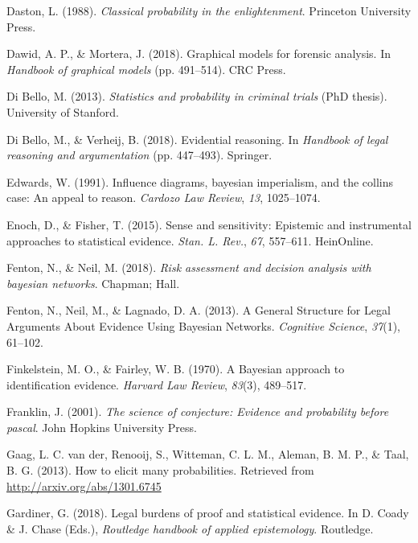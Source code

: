 \documentclass[11pt,dvipsnames,enabledeprecatedfontcommands]{scrartcl}
\begin{document}
\leavevmode\hypertarget{ref-daston1988}{}%
Daston, L. (1988). \emph{Classical probability in the enlightenment}.
Princeton University Press.

\leavevmode\hypertarget{ref-dawid2018graphical}{}%
Dawid, A. P., \& Mortera, J. (2018). Graphical models for forensic
analysis. In \emph{Handbook of graphical models} (pp. 491--514). CRC
Press.

\leavevmode\hypertarget{ref-di2013statistics}{}%
Di Bello, M. (2013). \emph{Statistics and probability in criminal
trials} (PhD thesis). University of Stanford.

\leavevmode\hypertarget{ref-di2018evidential}{}%
Di Bello, M., \& Verheij, B. (2018). Evidential reasoning. In
\emph{Handbook of legal reasoning and argumentation} (pp. 447--493).
Springer.

\leavevmode\hypertarget{ref-Edwards1991Influence-diagr}{}%
Edwards, W. (1991). Influence diagrams, bayesian imperialism, and the
collins case: An appeal to reason. \emph{Cardozo Law Review}, \emph{13},
1025--1074.

\leavevmode\hypertarget{ref-enoch2015sense}{}%
Enoch, D., \& Fisher, T. (2015). Sense and sensitivity: Epistemic and
instrumental approaches to statistical evidence. \emph{Stan. L. Rev.},
\emph{67}, 557--611. HeinOnline.

\leavevmode\hypertarget{ref-Fenton2018Risk}{}%
Fenton, N., \& Neil, M. (2018). \emph{Risk assessment and decision
analysis with bayesian networks}. Chapman; Hall.

\leavevmode\hypertarget{ref-fenton2013GeneralStructureLegal}{}%
Fenton, N., Neil, M., \& Lagnado, D. A. (2013). A General Structure for
Legal Arguments About Evidence Using Bayesian Networks. \emph{Cognitive
Science}, \emph{37}(1), 61--102.

\leavevmode\hypertarget{ref-Finkelstein1970A}{}%
Finkelstein, M. O., \& Fairley, W. B. (1970). A Bayesian approach to
identification evidence. \emph{Harvard Law Review}, \emph{83}(3),
489--517.

\leavevmode\hypertarget{ref-Franklin2001}{}%
Franklin, J. (2001). \emph{The science of conjecture: Evidence and
probability before pascal}. John Hopkins University Press.

\leavevmode\hypertarget{ref-gaag2013elicit}{}%
Gaag, L. C. van der, Renooij, S., Witteman, C. L. M., Aleman, B. M. P.,
\& Taal, B. G. (2013). How to elicit many probabilities. Retrieved from
\url{http://arxiv.org/abs/1301.6745}

\leavevmode\hypertarget{ref-gardiner2018}{}%
Gardiner, G. (2018). Legal burdens of proof and statistical evidence. In
D. Coady \& J. Chase (Eds.), \emph{Routledge handbook of applied
epistemology}. Routledge.
\end{document}
